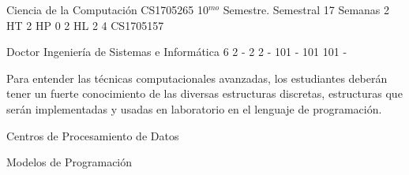\documentclass[a4paper,8pt]{article}
\begin{document}
\setNombreProfesor{}
\setGradoProfesorAbreviado{}
\sylabusHeader

\academicaTable
{Ciencia de la Computación} %
{CS1705265} %
{10$^{mo}$ Semestre.} %
{Semestral} %
{17 Semanas} %
{2 HT} %
{2 HP} %
{0} %
{2 HL}  %
{2} %
{4} %
{CS1705157} %

\administrativaTable
{Doctor} %
{Ingeniería de Sistemas e Informática} %
{6} %
{2} %
{-} %
{2} %
{2} %
{-} %
{101} %
{-} %
{101} %
{101} %
{-} %


\begin{fundamentacion}
Para entender las técnicas computacionales avanzadas, los estudiantes deberán tener un fuerte conocimiento de las
diversas estructuras discretas, estructuras que serán implementadas y usadas en laboratorio en el lenguaje de programación.

\end{fundamentacion}

\begin{sumilla}
\item \PDDistributedSystems
\item \PDCloudComputing
\item Centros de Procesamiento de Datos
\item \PDCloudComputing
\item \PDCloudComputing
\item Modelos de Programación

\end{sumilla}

\begin{competenciasAsignatura}
\item {}
\item {}
\item {}
\item {}
\item {}
\item {}

\end{competenciasAsignatura}
\end{document}
